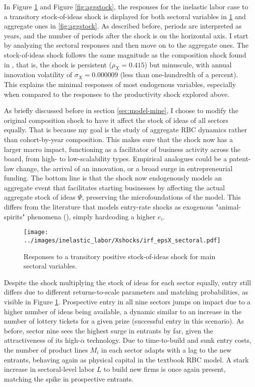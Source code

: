 \documentclass[a4paper,12pt]{article} %
\numberwithin{equation}{section} %
\numberwithin{figure}{section}
\numberwithin{table}{section}
\begin{document}
In Figure \ref{fig:multistock} and Figure \ref{fig:aggstock}, the responses for the inelastic labor case
to a transitory stock-of-ideas shock is displayed for both sectoral variables in 
\ref{fig:multistock} and aggregate ones in \ref{fig:aggstock}. As described before, periods are interpreted as years,
and the number of periods after the shock is on the horizontal axis. I start by analyzing the sectoral responses and
then move on to the aggregate ones. The stock-of-ideas shock follows the same magnitude as the composition shock found in
\textcite{sedlavcek2017growth}, that is, the shock is persistent ($\rho_X = 0.415$) but minuscule, with annual
innovation volatility of $\sigma_X = 0.000009$ (less than one-hundredth of a percent). This explains the minimal responses of
most endogenous variables, especially when compared to the responses to the productivity shock explored above.

As briefly discussed before in section \ref{sec:model-mine}, I choose to modify the original composition shock to have it affect the
stock of ideas of all sectors equally. That is because my goal is the study of aggregate RBC dynamics rather than cohort-by-year composition.
This makes sure that the shock now has a larger macro impact, functioning as a facilitator of business activity across the board, from high- 
to low-scalability types. Empirical analogues could be a patent-law change, the arrival of an innovation, or a broad surge in entrepreneurial 
funding. The bottom line is that the shock now endogenously models an aggregate event that facilitates starting businesses by affecting
the actual aggregate stock of ideas $\Psi$, preserving the microfoundations of the model. This differs from the literature that models entry-rate
shocks as exogenous "animal-spirits" phenomena (\cite{leduc2016uncertainty}), simply hardcoding a higher $e_i$.

\begin{figure}[H]
  \centering
  \texttt{[image: ../images/inelastic\_labor/Xshocks/irf\_epsX\_sectoral.pdf]}
  \caption{Responses to a transitory positive stock-of-ideas shock for main sectoral variables.}
  \label{fig:multistock}
\end{figure}

Despite the shock multiplying the stock of ideas for each sector equally, entry still differs due to different returns-to-scale parameters
and matching probabilities, as visible in Figure \ref{fig:multistock}. Prospective entry in all nine sectors jumps on impact due to a higher
number of ideas being available, a dynamic similar to an increase in the number of lottery tickets for a given prize (successful entry in
this scenario). As before, sector nine sees the highest surge in entrants by far, given the attractiveness of its high-$\alpha$ technology.
Due to time-to-build and sunk entry costs, the number of product lines $M_i$ in each sector adapts with a lag to the new entrants, behaving
again as physical capital in the textbook RBC model. A stark increase in sectoral-level labor $L$ to build new firms is once again present,
matching the spike in prospective entrants.
\end{document}
